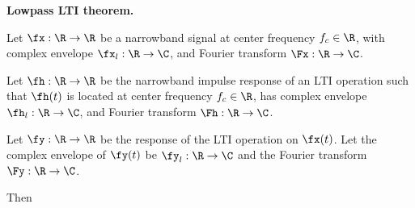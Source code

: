 \begin{theorem}{\bf Lowpass LTI theorem.}
\label{thm:cmplxEnvLTI}
\begin{enume}
  \item Let $\fx:\R\to\R$ be a narrowband signal
        at center frequency $f_c\in\R$,
        with complex envelope $\fx_l:\R\to\C$,
        and Fourier transform $\Fx:\R\to\C$.
  \item Let $\fh:\R\to\R$ be the narrowband impulse response
        of an LTI operation such that $\fh(t)$ is located
        at center frequency $f_c\in\R$,
        has complex envelope $\fh_l:\R\to\C$,
        and Fourier transform $\Fh:\R\to\C$.
  \item Let $\fy:\R\to\R$ be the response of
        the LTI operation on $\fx(t)$.
        Let the complex envelope of $\fy(t)$ be $\fy_l:\R\to\C$
        and the Fourier transform $\Fy:\R\to\C$.
\end{enume}
Then
\end{theorem}
